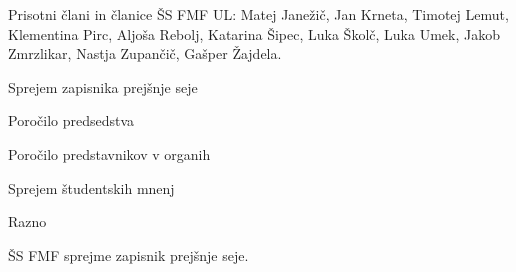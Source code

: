 \documentclass{seja}
\begin{document}
Prisotni člani in članice ŠS FMF UL:
Matej Janežič,
Jan Krneta,
Timotej Lemut,
Klementina Pirc,
Aljoša Rebolj,
Katarina Šipec,
Luka Školč,
Luka Umek,
Jakob Zmrzlikar,
Nastja Zupančič,
Gašper Žajdela.

\begin{red*}
	\item
	Sprejem zapisnika prejšnje seje
	\item
	Poročilo predsedstva
	\item
	Poročilo predstavnikov v organih
    \item
    Sprejem študentskih mnenj
    \item
    Razno
\end{red*}

\begin{ad}
    \item
    \begin{sklep*}
        ŠS FMF sprejme zapisnik prejšnje seje.
    \end{sklep*}
\end{ad}
\end{document}
